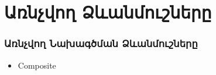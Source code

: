 \documentclass{beamer}
\begin{document}
\section{Առնչվող Ձևանմուշները}
\begin{frame}\frametitle{Առնչվող Նախագծման Ձևանմուշները}
\begin{itemize}
    \item Composite
\end{itemize}
\end{frame}
\end{document}
